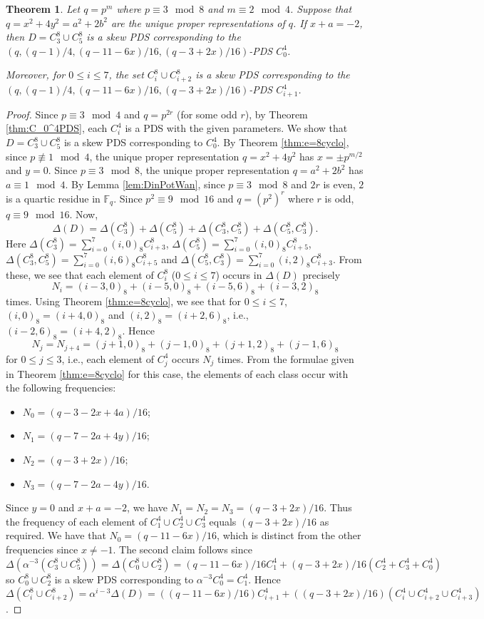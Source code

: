 \documentclass[12pt, a4paper]{article}
\newtheorem{theorem}{Theorem}[section]
\theoremstyle{definition}
\begin{document}
\begin{theorem}\label{thm:C_1^4skewPDS}
Let $q=p^m$ where $p \equiv 3 \mod 8$ and $m \equiv 2 \mod 4$.
Suppose that $q=x^2+4y^2=a^2+2b^2$
are the unique proper representations of $q$.
If $x+a=-2$, then $D=C_3^8 \cup C_5^8$ is a skew PDS corresponding to the $(q,(q-1)/4,(q-11-6x)/16,(q-3+2x)/16)$-PDS $C_0^4$.

Moreover, for $0 \leq i \leq 7$, the set $C_i^8 \cup C_{i+2}^8$ is a skew PDS corresponding to the $(q,(q-1)/4,(q-11-6x)/16,(q-3+2x)/16)$-PDS $C_{i+1}^4$.
\end{theorem}
\begin{proof}
Since $p \equiv 3 \mod 4$ and $q=p^{2r}$ (for some odd $r$), by Theorem \ref{thm:C_0^4PDS}, each $C_i^4$ is a PDS with the given parameters.  We show that $D=C_3^8 \cup C_5^8$ is a skew PDS corresponding to $C_0^4$.
By Theorem \ref{thm:e=8cyclo}, since $p \not\equiv 1 \mod 4$, the unique proper representation $q=x^2+4y^2$ has $x=\pm p^{m/2}$ and $y=0$.  Since $p \equiv 3 \mod 8$, the unique proper representation $q=a^2+2b^2$ has $a \equiv 1 \mod 4$.  By Lemma \ref{lem:DinPotWan}, since $p \equiv 3 \mod 8$ and $2r$ is even, $2$ is a quartic residue in $\mathbb{F}_q$.  Since $p^2 \equiv 9 \mod 16$ and $q=(p^2)^r$ where $r$ is odd, $q \equiv 9 \mod 16$. 
Now, $$\Delta(D)=\Delta(C_3^8)+\Delta(C_5^8)+\Delta(C_3^8,C_5^8)+\Delta(C_5^8,C_3^8).$$
Here $\Delta(C_3^8)=\sum_{i=0}^7 (i,0)_8 C_{i+3}^8$, $\Delta(C_5^8)=\sum_{i=0}^7 (i,0)_8 C_{i+5}^8$, $\Delta(C_3^8, C_5^8)=\sum_{i=0}^7 (i,6)_8 C_{i+5}^8$ and $\Delta(C_5^8,C_3^8)=\sum_{i=0}^7 (i,2)_8 C_{i+3}^8$.  From these, we see that each element of $C_i^8$ ($0 \leq i \leq 7$) occurs in $\Delta(D)$ precisely
$$N_i=(i-3,0)_8+(i-5,0)_8+(i-5,6)_8+(i-3,2)_8$$
times.  
Using Theorem \ref{thm:e=8cyclo}, we see that for $0 \leq i \leq 7$, $(i,0)_8=(i+4,0)_8$ and $(i,2)_8=(i+2,6)_8$, i.e., $(i-2,6)_8=(i+4,2)_8$. Hence 
$$N_j=N_{j+4}=(j+1,0)_8+(j-1,0)_8+(j+1,2)_8+(j-1,6)_8$$ 
for $0 \leq j \leq 3$, i.e., each element of $C_j^4$ occurs $N_j$ times.  From the formulae given in Theorem \ref{thm:e=8cyclo} for this case, the elements of each class occur with the following frequencies:
\begin{itemize}
\item $N_0=(q-3-2x+4a)/16$; 
\item $N_1=(q-7-2a+4y)/16$;
\item $N_2=(q-3+2x)/16$;
\item $N_3=(q-7-2a-4y)/16$.
\end{itemize}
Since $y=0$ and $x+a=-2$, we have $N_1=N_2=N_3=(q-3+2x)/16$. Thus the frequency of each element of $C_1^4 \cup C_2^4 \cup C_3^4$ equals $(q-3+2x)/16$ as required. We have that $N_0=(q-11-6x)/16$, which is distinct from the other frequencies since $x \neq -1$.
The second claim follows since $\Delta(\alpha^{-3}(C_3^8 \cup C_5^8))=\Delta(C_0^8 \cup C_2^8)=(q-11-6x)/16 C_1^4 + (q-3+2x)/16 (C_2^4+C_3^4+C_0^4)$ so $C_0^8 \cup C_2^8$ is a skew PDS corresponding to $\alpha^{-3}C_0^4=C_1^4$.  Hence $\Delta(C_i^8 \cup C_{i+2}^8)= \alpha^{i-3}\Delta(D)= ((q-11-6x)/16) C_{i+1}^4 + ((q-3+2x)/16) (C_i^4 \cup C_{i+2}^4 \cup C_{i+3}^4)$.
\end{proof}
\end{document}
